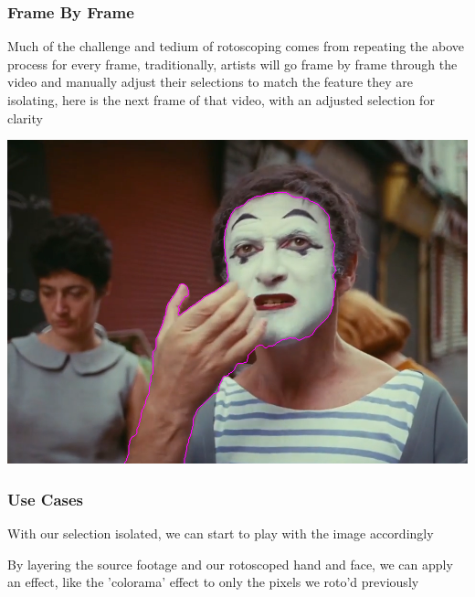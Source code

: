 \documentclass[11pt]{article}
\begin{document}
\subsubsection{Frame By Frame}
\label{sec:org2723b87}
Much of the challenge and tedium of rotoscoping comes from repeating the above
process for every frame, traditionally, artists will go frame by frame through
the video and manually adjust their selections to match the feature they are
isolating, here is the next frame of that video, with an adjusted selection for
clarity

\begin{center}
\includegraphics[width=.9\linewidth]{./roto/nextframe.PNG}
\end{center}
\subsubsection{Use Cases}
\label{sec:orge055300}
With our selection isolated, we can start to play with the image accordingly

By layering the source footage and our rotoscoped hand and face, we can apply an
effect, like the 'colorama' effect to only the pixels we roto'd previously
\end{document}
